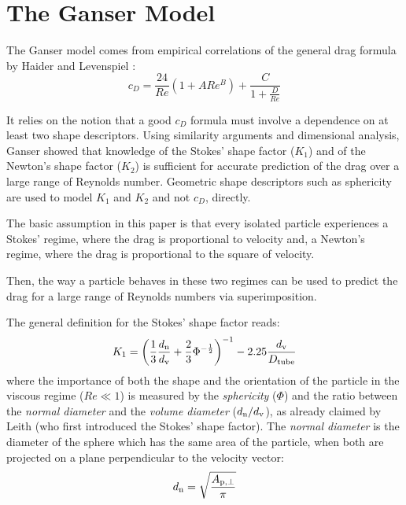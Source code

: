 		
	\section{The Ganser Model}
		The Ganser model \cite{Ganser-1993} comes from empirical correlations of the general drag formula by Haider and Levenspiel \cite{HaiderLevenspiel-1989}:
		\begin{equation}
			c_D = \frac{24}{Re} (1 + A Re^B) + \dfrac{C}{1 + \frac{D}{Re}}
		\end{equation}
	
		It relies on the notion that a good $ c_D $ formula must involve a dependence on at least two shape descriptors. Using similarity arguments and dimensional analysis, Ganser showed that knowledge of the Stokes' shape factor ($ K_1 $) and of the Newton's shape factor ($ K_2 $) is sufficient for accurate prediction of the drag over a large range of Reynolds number. 
		Geometric shape descriptors such as sphericity are used	to model $ K_1 $ and $ K_2 $ and not $ c_D $, directly.
		
		The basic assumption in this paper is that every isolated particle experiences a Stokes’ regime, where the drag is proportional to velocity and, a Newton’s regime, where the drag is proportional to the square of velocity. 
		
		Then, the way a particle behaves in these two regimes can be used to predict the drag for a large range of Reynolds numbers via superimposition.
		
		The general definition for the Stokes' shape factor reads:
		\begin{equation}
			K_1 = \left( \frac{1}{3} \frac{d_{\textup{n}}}{d_{\textup{v}}} + \frac{2}{3} \Phi^{-\frac{1}{2}} \right)^{-1} -2.25 \frac{d_{\textup{v}}}{D_{\textup{tube}}}
			\label{eq: K1}
		\end{equation}
		where the importance of both the shape and the orientation of the particle in the viscous regime ($ Re \ll 1 $) is measured by the \textit{sphericity} ($ \Phi $) and the ratio between the \textit{normal diameter} and the \textit{volume diameter} ($ d_{\textup{n}} / d_{\textup{v}} $), as already claimed by Leith \cite{Leith-1987} (who first introduced the Stokes' shape factor).
		The \textit{normal diameter} is the diameter of the sphere which has the same area of the particle, when both are projected on a plane perpendicular to the velocity vector:
		\begin{equation}
			d_{\textup{n}} = \sqrt{\dfrac{A_{\textup{p}, \perp}}{\pi}}
			\label{eq: dn}
		\end{equation}
		
